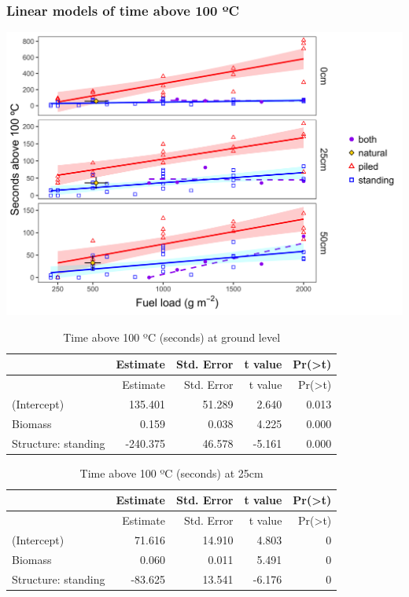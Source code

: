 \documentclass[11pt,a4paper]{article}
\begin{document}
\hypertarget{linear-models-of-time-above-100-c}{%
\subsubsection{Linear models of time above 100
ºC}\label{linear-models-of-time-above-100-c}}

\includegraphics{figures/compare_secsAbv100-1.png}

\begin{longtable}[]{@{}lrrrr@{}}
\caption{Time above 100 ºC (seconds) at ground level}\tabularnewline
\toprule
& Estimate & Std. Error & t value &
Pr(\textgreater{}\textbar{}t\textbar{})\tabularnewline
\midrule
\endfirsthead
\toprule
& Estimate & Std. Error & t value &
Pr(\textgreater{}\textbar{}t\textbar{})\tabularnewline
\midrule
\endhead
(Intercept) & 135.401 & 51.289 & 2.640 & 0.013\tabularnewline
Biomass & 0.159 & 0.038 & 4.225 & 0.000\tabularnewline
Structure: standing & -240.375 & 46.578 & -5.161 & 0.000\tabularnewline
\bottomrule
\end{longtable}

\begin{longtable}[]{@{}lrrrr@{}}
\caption{Time above 100 ºC (seconds) at 25cm}\tabularnewline
\toprule
& Estimate & Std. Error & t value &
Pr(\textgreater{}\textbar{}t\textbar{})\tabularnewline
\midrule
\endfirsthead
\toprule
& Estimate & Std. Error & t value &
Pr(\textgreater{}\textbar{}t\textbar{})\tabularnewline
\midrule
\endhead
(Intercept) & 71.616 & 14.910 & 4.803 & 0\tabularnewline
Biomass & 0.060 & 0.011 & 5.491 & 0\tabularnewline
Structure: standing & -83.625 & 13.541 & -6.176 & 0\tabularnewline
\bottomrule
\end{longtable}
\end{document}
